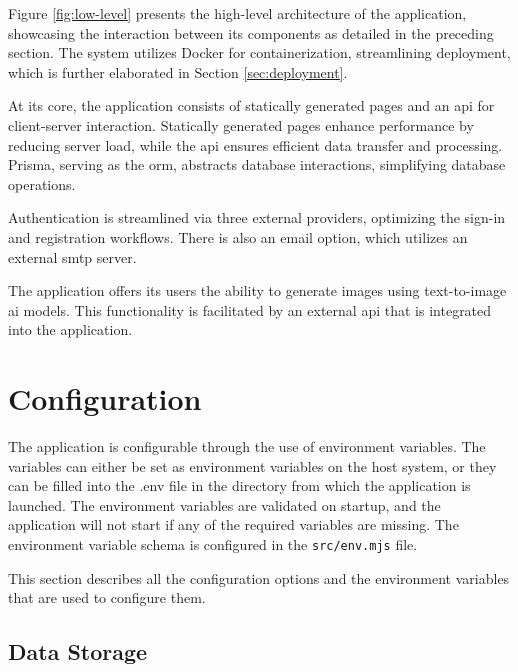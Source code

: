 
Figure \ref{fig:low-level} presents the high-level architecture of the application, showcasing the interaction between its components as detailed in the preceding section. The system utilizes Docker for containerization, streamlining deployment, which is further elaborated in Section \ref{sec:deployment}.

At its core, the application consists of statically generated pages and an \acrshort{api} for client-server interaction. Statically generated pages enhance performance by reducing server load, while the \acrshort{api} ensures efficient data transfer and processing. Prisma, serving as the \acrfull{orm}, abstracts database interactions, simplifying database operations.\cite{prisma}

Authentication is streamlined via three external providers, optimizing the sign-in and registration workflows. There is also an email option, which utilizes an external \acrfull{smtp} server.

The application offers its users the ability to generate images using text-to-image \acrfull{ai} models. This functionality is facilitated by an external \acrshort{api} that is integrated into the application.

\section{Configuration}

The application is configurable through the use of environment variables. The variables can either be set as environment variables on the host system, or they can be filled into the .env file in the directory from which the application is launched. The environment variables are validated on startup, and the application will not start if any of the required variables are missing. The environment variable schema is configured in the \texttt{src/env.mjs} file.

This section describes all the configuration options and the environment variables that are used to configure them.

\subsection{Data Storage}

